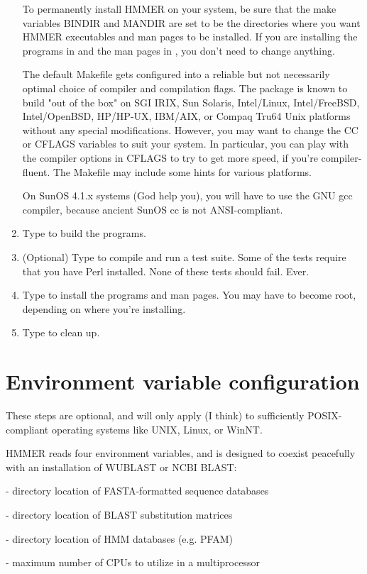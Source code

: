 \begin{enumerate}
To permanently install HMMER on your system, be sure that the make
variables BINDIR and MANDIR are set to be the directories where you
want HMMER executables and man pages to be installed. If you are
installing the programs in  and the man pages in
, you don't need to change anything.

The default Makefile gets configured into a reliable but not
necessarily optimal choice of compiler and compilation flags. The
package is known to build "out of the box" on SGI IRIX, Sun Solaris,
Intel/Linux, Intel/FreeBSD, Intel/OpenBSD, HP/HP-UX, IBM/AIX, or
Compaq Tru64 Unix platforms without any special
modifications. However, you may want to change the CC or CFLAGS
variables to suit your system.  In particular, you can play with the
compiler options in CFLAGS to try to get more speed, if you're
compiler-fluent. The Makefile may include some hints for various
platforms.

On SunOS 4.1.x systems (God help you), you will have to use the GNU
gcc compiler, because ancient SunOS cc is not ANSI-compliant.

\item Type  to build the programs.

\item (Optional) Type  to compile and run a test suite.
Some of the tests require that you have Perl installed. None of these
tests should fail. Ever.

\item Type  to install the programs and man pages. 
You may have to become root, depending on where you're installing.

\item Type  to clean up. 
\end{enumerate}

\section{Environment variable configuration}

These steps are optional, and will only apply (I think) to
sufficiently POSIX-compliant operating systems like UNIX, Linux, or
WinNT.

HMMER reads four environment variables, and is designed to coexist
peacefully with an installation of WUBLAST or NCBI BLAST:

\begin{wideitem}
\item[\emprog{BLASTDB}] - directory location of FASTA-formatted sequence databases
\item[\emprog{BLASTMAT}] - directory location of BLAST substitution matrices
\item[\emprog{HMMERDB}] - directory location of HMM databases (e.g. PFAM)
\item[\emprog{HMMER\_NCPU}] - maximum number of CPUs to utilize in a multiprocessor
\end{wideitem}

